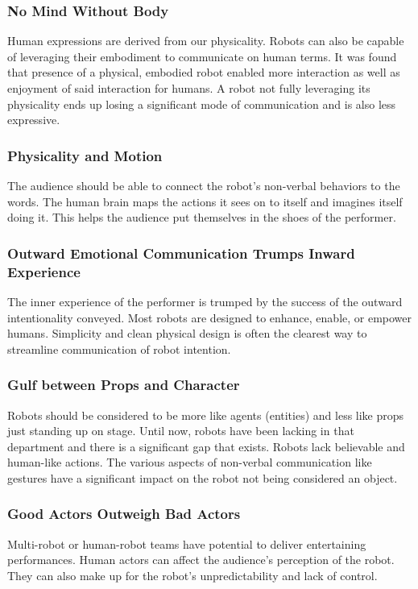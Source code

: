 \subsubsection{No Mind Without Body}
Human expressions are derived from our physicality. Robots can also be capable of leveraging their embodiment to communicate on human terms. It was found that presence of a physical, embodied robot enabled more interaction as well as enjoyment of said interaction for humans. A robot not fully leveraging its physicality ends up losing a significant mode of communication and is also less expressive.

\subsubsection{Physicality and Motion}
The audience should be able to connect the robot's non-verbal behaviors to the words. The human brain maps the actions it sees on to itself and imagines itself doing it. This helps the audience put themselves in the shoes of the performer.

\subsubsection{Outward Emotional Communication Trumps Inward Experience}
The inner experience of the performer is trumped by the success of the outward intentionality conveyed. Most robots are designed to enhance, enable, or empower humans. Simplicity and clean physical design is often the clearest way to streamline communication of robot intention.

\subsubsection{Gulf between Props and Character}
Robots should be considered to be more like agents (entities) and less like props just standing up on stage. Until now, robots have been lacking in that department and there is a significant gap that exists. Robots lack believable and human-like actions. The various aspects of non-verbal communication like gestures have a significant impact on the robot not being considered an object.

\subsubsection{Good Actors Outweigh Bad Actors}
Multi-robot or human-robot teams have potential to deliver entertaining performances. Human actors can affect the audience's perception of the robot. They can also make up for the robot's unpredictability and lack of control.


